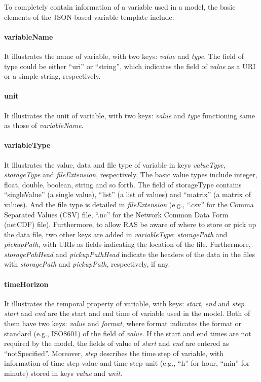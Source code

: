\documentclass[review]{elsarticle}
\begin{document}
To completely contain information of a variable used in a model, the basic elements of the JSON-based variable template include:

\paragraph{variableName} It illustrates the name of variable, with two keys: \textit{value} and \textit{type}. The field of type could be either “uri” or “string”, which indicates the field of \textit{value} as a URI or a simple string, respectively.

\paragraph{unit} It illustrates the unit of variable, with two keys: \textit{value} and \textit{type} functioning same as those of \textit{variableName}.

\paragraph{variableType} It illustrates the value, data and file type of variable in keys \textit{valueType}, \textit{storageType} and \textit{fileExtension}, respectively. The basic value types include integer, float, double, boolean, string and so forth. The field of storageType contains “singleValue” (a single value), “list” (a list of values) and “matrix” (a matrix of values). And the file type is detailed in \textit{fileExtension} (e.g., “.csv” for the Comma Separated Values (CSV) file, “.nc” for the Network Common Data Form (netCDF) file). Furthermore, to allow RAS be aware of where to store or pick up the data file, two other keys are added in \textit{variableType}: \textit{storagePath} and \textit{pickupPath}, with URIs as fields indicating the location of the file. Furthermore, \textit{storagePahHead} and \textit{pickupPathHead} indicate the headers of the data in the files with \textit{storagePath} and \textit{pickupPath}, respectively, if any.

\paragraph{timeHorizon} It illustrates the temporal property of variable, with keys: \textit{start}, \textit{end} and \textit{step}. \textit{start} and \textit{end} are the start and end time of variable used in the model. Both of them have two keys: \textit{value} and \textit{format}, where format indicates the format or standard (e.g., ISO8601) of the field of \textit{value}. If the start and end times are not required by the model, the fields of value of \textit{start} and \textit{end} are entered as “notSpecified”.  Moreover, \textit{step} describes the time step of variable, with information of time step value and time step unit (e.g., “h” for hour, “min” for minute) stored in keys \textit{value} and \textit{unit}.
\end{document}
